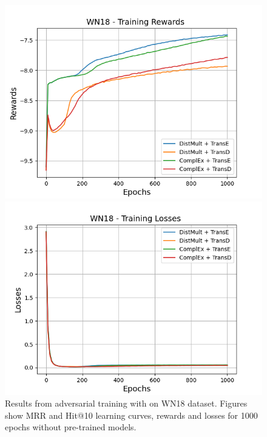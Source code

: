 \begin{figure}[H]
    \begin{minipage}{.45\textwidth}
      \centering
      \includegraphics[width=0.9\linewidth]{figures/results/gan_train/not_pretrained/random/wn18/epochs1000/random_wn18_rew.png}
    \end{minipage}%
     \begin{minipage}{.45\textwidth}
      \centering
      \includegraphics[width=0.9\linewidth]{figures/results/gan_train/not_pretrained/random/wn18/epochs1000/random_wn18_losses.png}
    \end{minipage}%
    \caption{Results from adversarial training with \origsampling on \textsc{WN18} dataset.
    Figures show MRR and Hit@10 learning curves, rewards and losses for 1000 epochs without pre-trained models.}
    \label{fig:gan_train_not_pretrained_random_wn18}
\end{figure}
